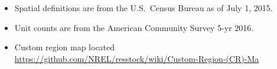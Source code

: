 \begin{itemize}
\item Spatial definitions are from the U.S.~Census Bureau as of July 1, 2015.
\item Unit counts are from the American Community Survey 5-yr 2016.
\item Custom region map located \href{https://github.com/NREL/resstock/wiki/Custom-Region-(CR)-Map}{https://github.com/NREL/resstock/wiki/Custom-Region-(CR)-Ma}
\end{itemize}
